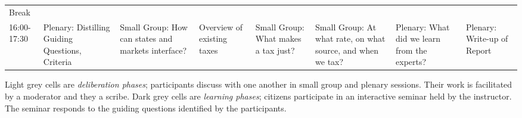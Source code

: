 \begin{landscape}
\begin{longtabu}[]{XX[2]X[2]X[2]X[2]X[2]X[2]X[2]}
Break
&
&
&
&
&
&
&
\\

16:00-17:30
&	
	Plenary: Distilling Guiding Questions, Criteria
&	
	Small Group: How can states and markets interface?
&	
	Overview of existing taxes
&	
	Small Group: What makes a tax just?
&	
	Small Group: At what rate, on what source, and when we tax?
&	
	Plenary: What did we learn from the experts?
&	
	Plenary: Write-up of Report
\\



\bottomrule
\end{longtabu}
\scriptsize{
	Light grey cells are \emph{deliberation phases}; participants discuss with one another in small group and plenary sessions.
	Their work is facilitated by a moderator and they a scribe.
	Dark grey cells are \emph{learning phases}; citizens participate in an interactive seminar held by the instructor.
	The seminar responds to the guiding questions identified by the participants.
	}

\end{landscape}